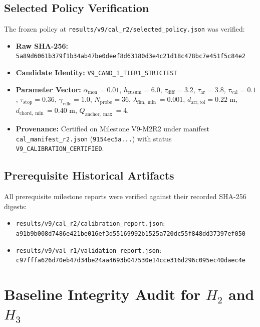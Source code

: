 \documentclass[10pt,a4paper]{article}
\begin{document}
\subsection{Selected Policy Verification}
The frozen policy at \texttt{results/v9/cal\_r2/selected\_policy.json} was verified:
\begin{itemize}
    \item \textbf{Raw SHA-256:} \texttt{5a89d6061b379f1b34ab47be0deef8d63180d3e4c21d18c478bc7e451f5c84e2}
    \item \textbf{Candidate Identity:} \texttt{V9\_CAND\_1\_TIER1\_STRICTEST}
    \item \textbf{Parameter Vector:} $\alpha_{\mathrm{mon}} = 0.01$, $h_{\mathrm{cusum}} = 6.0$, $\tau_{\mathrm{diff}} = 3.2$, $\tau_{\mathrm{ar}} = 3.8$, $\tau_{\mathrm{val}} = 0.1$, $\tau_{\mathrm{stop}} = 0.36$, $\gamma_{\mathrm{ville}} = 1.0$, $N_{\mathrm{probe}} = 36$, $\lambda_{\mathrm{fim},\min} = 0.001$, $d_{\mathrm{arr},\mathrm{tol}} = 0.22\text{ m}$, $d_{\mathrm{chord},\min} = 0.40\text{ m}$, $Q_{\mathrm{anchor},\max} = 4$.
    \item \textbf{Provenance:} Certified on Milestone V9-M2R2 under manifest \texttt{cal\_manifest\_r2.json} (\texttt{9154ec5a...}) with status \texttt{V9\_CALIBRATION\_CERTIFIED}.
\end{itemize}

\subsection{Prerequisite Historical Artifacts}
All prerequisite milestone reports were verified against their recorded SHA-256 digests:
\begin{itemize}
    \item \texttt{results/v9/cal\_r2/calibration\_report.json}: \texttt{a91b9b008d7486e421be016ef3d55169992b1525a720dc55f848dd37397ef050}
    \item \texttt{results/v9/val\_r1/validation\_report.json}: \texttt{c97fffa626d70eb47d34be24aa4693b047530e14cce316d296c095ec40daec4e}
\end{itemize}

\section{Baseline Integrity Audit for $H_2$ and $H_3$}
\end{document}
